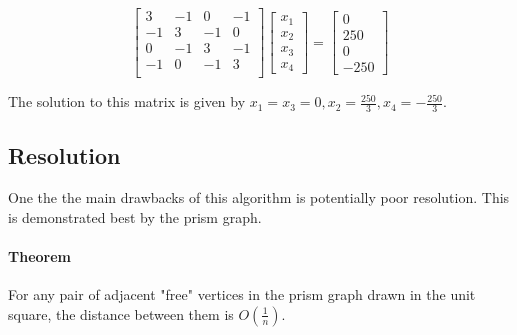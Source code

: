 \documentclass[11pt]{article}
\begin{document}
\[
\begin{bmatrix}
    3 & -1 & 0 & -1 \\
    -1 & 3 & -1 & 0 \\
    0 & -1 & 3 & -1 \\
    -1 & 0 & -1 & 3 \\
\end{bmatrix}
\begin{bmatrix} x_1 \\ x_2 \\ x_3 \\ x_4 \end{bmatrix} =
\begin{bmatrix} 0 \\ 250 \\ 0 \\ -250 \end{bmatrix}
\]

The solution to this matrix is given by $x_1 = x_3 = 0, x_2 = \frac{250}{3}, x_4 = -\frac{250}{3}$.

\subsection{Resolution}
One the the main drawbacks of this algorithm is potentially poor resolution. This is demonstrated best by the prism graph.

\paragraph{Theorem} For any pair of adjacent "free" vertices in the prism graph drawn in the unit square, the distance between them is $O(\frac{1}{n})$.
\end{document}
